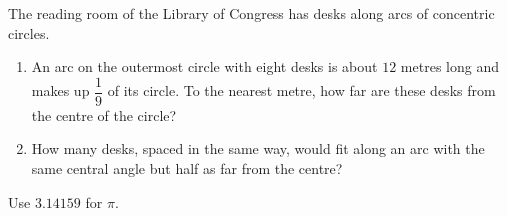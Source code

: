 The reading room of the Library of Congress has desks along arcs of concentric circles.
\begin{enumerate}
\item[(a)] An arc on the outermost circle with eight desks is about $12$ metres long and makes up $\dfrac{1}{9}$ of its circle. To the nearest metre, how far are these desks from the centre of the circle?
\item[(b)] How many desks, spaced in the same way, would fit along an arc with the same central angle but half as far from the centre?
\end{enumerate}
Use $3.14159$ for $\pi$.
